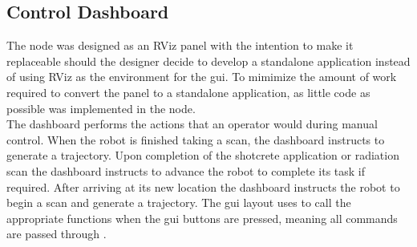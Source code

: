 \subsection{Control Dashboard}
The  node was designed as an RViz panel with the intention to make it replaceable should the designer decide to develop a standalone application instead of using RViz as the environment for the \acrshort{gui}. To mimimize the amount of work required to convert the panel to a standalone application, as little code as possible was implemented in the node.\\

The dashboard performs the actions that an operator would during manual control. When the robot is finished taking a scan, the dashboard instructs  to generate a trajectory. Upon completion of the shotcrete application or radiation scan the dashboard instructs  to advance the robot to complete its task if required. After arriving at its new location the dashboard instructs the robot to begin a scan and generate a trajectory. The \acrshort{gui} layout uses  to call the appropriate  functions when the \acrshort{gui} buttons are pressed, meaning all commands are passed through .\\
